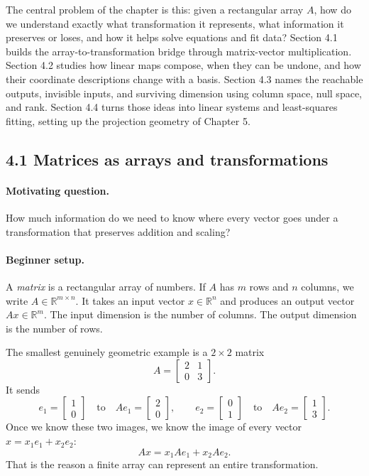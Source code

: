 The central problem of the chapter is this: given a rectangular array \(A\), how do we understand exactly what transformation it represents, what information it preserves or loses, and how it helps solve equations and fit data? Section 4.1 builds the array-to-transformation bridge through matrix-vector multiplication. Section 4.2 studies how linear maps compose, when they can be undone, and how their coordinate descriptions change with a basis. Section 4.3 names the reachable outputs, invisible inputs, and surviving dimension using column space, null space, and rank. Section 4.4 turns those ideas into linear systems and least-squares fitting, setting up the projection geometry of Chapter 5.

\subsection{4.1 Matrices as arrays and transformations}

\paragraph{Motivating question.}
How much information do we need to know where every vector goes under a transformation that preserves addition and scaling?

\paragraph{Beginner setup.}
A \emph{matrix} is a rectangular array of numbers. If \(A\) has \(m\) rows and \(n\) columns, we write \(A\in\mathbb{R}^{m\times n}\). It takes an input vector \(x\in\mathbb{R}^n\) and produces an output vector \(Ax\in\mathbb{R}^m\). The input dimension is the number of columns. The output dimension is the number of rows.

The smallest genuinely geometric example is a \(2\times 2\) matrix
\[
A=
\begin{bmatrix}
2 & 1\\
0 & 3
\end{bmatrix}.
\]
It sends
\[
e_1=\begin{bmatrix}1\\0\end{bmatrix}
\quad\text{to}\quad
Ae_1=\begin{bmatrix}2\\0\end{bmatrix},
\qquad
e_2=\begin{bmatrix}0\\1\end{bmatrix}
\quad\text{to}\quad
Ae_2=\begin{bmatrix}1\\3\end{bmatrix}.
\]
Once we know these two images, we know the image of every vector \(x=x_1e_1+x_2e_2\):
\[
Ax=x_1Ae_1+x_2Ae_2.
\]
That is the reason a finite array can represent an entire transformation.

